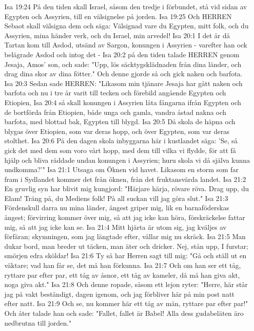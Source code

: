 Isa 19:24  På den tiden skall Israel, såsom den tredje i förbundet, stå vid sidan av Egypten och Assyrien, till en välsignelse på jorden.
Isa 19:25  Och HERREN Sebaot skall välsigna dem och säga: Välsignad vare du Egypten, mitt folk, och du Assyrien, mina händer verk, och du Israel, min arvedel!
Isa 20:1  I det år då Tartan kom till Asdod, utsänd av Sargon, konungen i Assyrien - varefter han ock belägrade Asdod och intog det -
Isa 20:2  på den tiden talade HERREN genom Jesaja, Amos' son, och sade: "Upp, lös säcktygsklädnaden från dina länder, och drag dina skor av dina fötter." Och denne gjorde så och gick naken och barfota.
Isa 20:3  Sedan sade HERREN: "Likasom min tjänare Jesaja har gått naken och barfota och nu i tre år varit till tecken och förebild angående Egypten och Etiopien,
Isa 20:4  så skall konungen i Assyrien låta fångarna ifrån Egypten och de bortförda från Etiopien, både unga och gamla, vandra åstad nakna och barfota, med blottad bak, Egypten till blygd.
Isa 20:5  Då skola de häpna och blygas över Etiopien, som var deras hopp, och över Egypten, som var deras stolthet.
Isa 20:6  På den dagen skola inbyggarna här i kustlandet säga: 'Se, så gick det med dem som voro vårt hopp, med dem till vilka vi flydde, för att få hjälp och bliva räddade undan konungen i Assyrien; huru skola vi då själva kunna undkomma?'"
Isa 21:1  Utsaga om Öknen vid havet. Likasom en storm som far fram i Sydlandet kommer det från öknen, från det fruktansvärda landet.
Isa 21:2  En gruvlig syn har blivit mig kungjord: "Härjare härja, rövare röva. Drag upp, du Elam! Träng på, du Mediens folk! På all suckan vill jag göra slut."
Isa 21:3  Fördenskull darra nu mina länder, ångest griper mig, lik en barnaföderskas ångest; förvirring kommer över mig, så att jag icke kan höra, förskräckelse fattar mig, så att jag icke kan se.
Isa 21:4  Mitt hjärta är utom sig, jag kväljes av förfäran; skymningen, som jag längtade efter, vållar mig nu skräck.
Isa 21:5  Man dukar bord, man breder ut täcken, man äter och dricker. Nej, stån upp, I furstar; smörjen edra sköldar!
Isa 21:6  Ty så har Herren sagt till mig: "Gå och ställ ut en väktare; vad han får se, det må han förkunna.
Isa 21:7  Och om han ser ett tåg, ryttare par efter par, ett tåg av åsnor, ett tåg av kameler, då må han giva akt, noga giva akt."
Isa 21:8  Och denne ropade, såsom ett lejon ryter: "Herre, här står jag på vakt beständigt, dagen igenom, och jag förbliver här på min post natt efter natt.
Isa 21:9  Och se, nu kommer här ett tåg av män, ryttare par efter par!" Och åter talade han och sade: "Fallet, fallet är Babel! Alla dess gudabeläten äro nedbrutna till jorden."
